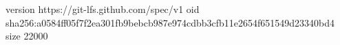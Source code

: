 version https://git-lfs.github.com/spec/v1
oid sha256:a0584ff05f7f2ea301fb9bebcb987e974cdbb3cfb11e2654f651549d23340bd4
size 22000

